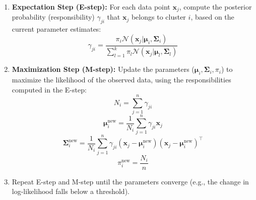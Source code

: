 \documentclass{article}
\begin{document}
\begin{multicols}{2}
	\begin{enumerate}
		\item \textbf{Expectation Step (E-step):} For each data point $\mathbf{x}_j$, compute the posterior probability (responsibility) $\gamma_{ji}$ that $\mathbf{x}_j$ belongs to cluster $i$, based on the current parameter estimates:
		      $$
			      \gamma_{ji} = \frac{\pi_i \mathcal{N}(\mathbf{x}_j | \boldsymbol{\mu}_i, \boldsymbol{\Sigma}_i)}{\sum_{l=1}^{k} \pi_l \mathcal{N}(\mathbf{x}_j | \boldsymbol{\mu}_l, \boldsymbol{\Sigma}_l)}
		      $$
		\item \textbf{Maximization Step (M-step):} Update the parameters ($\boldsymbol{\mu}_i, \boldsymbol{\Sigma}_i, \pi_i$) to maximize the likelihood of the observed data, using the responsibilities computed in the E-step:
		      $$
			      N_i = \sum_{j=1}^n \gamma_{ji}
		      $$
		      $$
			      \boldsymbol{\mu}_i^{\text{new}} = \frac{1}{N_i} \sum_{j=1}^n \gamma_{ji} \mathbf{x}_j
		      $$
		      $$
			      \boldsymbol{\Sigma}_i^{\text{new}} = \frac{1}{N_i} \sum_{j=1}^n \gamma_{ji} (\mathbf{x}_j - \boldsymbol{\mu}_i^{\text{new}})(\mathbf{x}_j - \boldsymbol{\mu}_i^{\text{new}})^{\top}
		      $$
		      $$
			      \pi_i^{\text{new}} = \frac{N_i}{n}
		      $$
		\item Repeat E-step and M-step until the parameters converge (e.g., the change in log-likelihood falls below a threshold).
	\end{enumerate}


\end{multicols}
\end{document}
